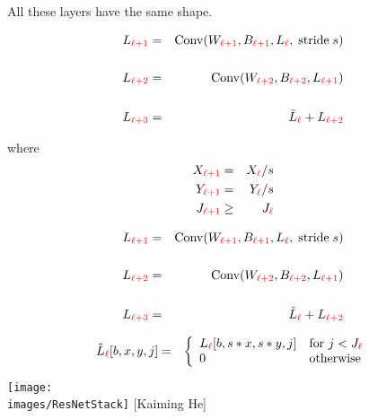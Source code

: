 {\vfill All these layers have the same shape.


\medskip
\begin{eqnarray*}
L_{\color{red} \ell+1} & = & \mathrm{Conv}(W_{\color{red} \ell+1},B_{\color{red} \ell+1},L_{\color{red} \ell},\;\mathrm{stride} \;s) \\
\\
L_{\color{red} \ell+2} & = & \mathrm{Conv}(W_{\color{red} \ell+2},B_{\color{red} \ell+2},L_{\color{red} \ell+1}) \\
\\
L_{\color{red} \ell+3} & = & \tilde{L}_{\color{red} \ell} + L_{\color{red} \ell+2}
\end{eqnarray*}

\vfill
where
\begin{eqnarray*}
X_{\color{red} \ell+1} & = & X_{\color{red} \ell}/s \\
Y_{\color{red} \ell+1} & = & Y_{\color{red} \ell}/s \\
J_{\color{red} \ell+1} & \geq &  J_{\color{red} \ell}
\end{eqnarray*}


\medskip
\begin{eqnarray*}
L_{\color{red} \ell+1} & = & \mathrm{Conv}(W_{\color{red} \ell+1},B_{\color{red} \ell+1},L_{\color{red} \ell},\;\mathrm{stride} \;s) \\
\\
L_{\color{red} \ell+2} & = & \mathrm{Conv}(W_{\color{red} \ell+2},B_{\color{red} \ell+2},L_{\color{red} \ell+1}) \\
\\
L_{\color{red} \ell+3} & = & \tilde{L}_{\color{red} \ell} + L_{\color{red} \ell+2}
\end{eqnarray*}

\vfill
\begin{eqnarray*}
\tilde{L}_{\color{red} \ell}[b,x,y,j] & = & \left\{\begin{array}{ll} L_{\color{red} \ell}[b,s*x,s*y,j] & \mbox{for $j < J_{\color{red} \ell}$} \\ 0 & \mbox{otherwise} \end{array}\right.
\end{eqnarray*}




\centerline{\texttt{[image: \\images/ResNetStack]} {\large [Kaiming He]}}


}
